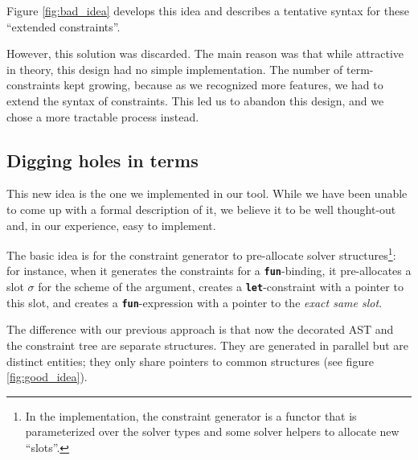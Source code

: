 \documentclass[10pt,a4paper,twoside,titlepage,twocolumn]{article}
\newcommand{\code}[1]{\textbf{\texttt{#1}}}
\begin{document}
Figure \vref{fig:bad_idea} develops this idea and describes a tentative syntax
for these ``extended constraints''.

However, this solution was discarded. The main reason was that while attractive
in theory, this design had no simple implementation. The number of
term-constraints kept growing, because as we recognized more features, we had to
extend the syntax of constraints. This led us to abandon this design, and we
chose a more tractable process instead.

\subsection{Digging holes in terms}

This new idea is the one we implemented in our tool. While we have been unable
to come up with a formal description of it, we believe it to be well thought-out
and, in our experience, easy to implement.

The basic idea is for the constraint generator to pre-allocate solver
structures\footnote{In the implementation, the constraint generator is a functor
that is parameterized over the solver types and some solver helpers to allocate
new ``slots''.}: for instance, when it generates the constraints for a
\code{fun}-binding, it pre-allocates a slot $\sigma$ for the scheme of the
argument, creates a \code{let}-constraint with a pointer to this slot, and
creates a \code{fun}-expression with a pointer to the \emph{exact same slot}.

The difference with our previous approach is that now the decorated AST
and the constraint tree are separate structures. They are generated in parallel
but are distinct entities; they only share pointers to common structures (see
figure \vref{fig:good_idea}).
\end{document}
